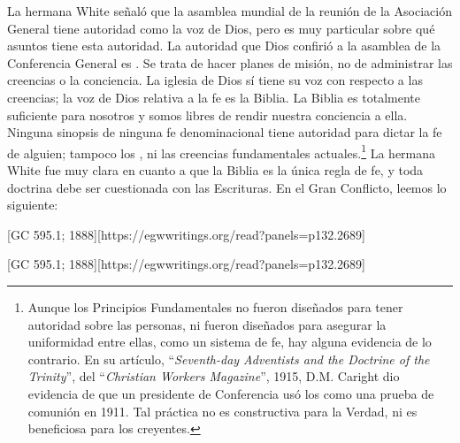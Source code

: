 La hermana White señaló que la asamblea mundial de la reunión de la Asociación General tiene autoridad como la voz de Dios, pero es muy particular sobre qué asuntos tiene esta autoridad. La autoridad que Dios confirió a la asamblea de la Conferencia General es . Se trata de hacer planes de misión, no de administrar las creencias o la conciencia. La iglesia de Dios sí tiene su voz con respecto a las creencias; la voz de Dios relativa a la fe es la Biblia. La Biblia es totalmente suficiente para nosotros y somos libres de rendir nuestra conciencia a ella. Ninguna sinopsis de ninguna fe denominacional tiene autoridad para dictar la fe de alguien; tampoco los , ni las creencias fundamentales actuales.\footnote{Aunque los Principios Fundamentales no fueron diseñados para tener autoridad sobre las personas, ni fueron diseñados para asegurar la uniformidad entre ellas, como un sistema de fe, hay alguna evidencia de lo contrario. En su artículo, “\textit{Seventh-day Adventists and the Doctrine of the Trinity}”, del “\textit{Christian Workers Magazine}”, 1915, D.M. Caright dio evidencia de que un presidente de Conferencia usó los  como una prueba de comunión en 1911. Tal práctica no es constructiva para la Verdad, ni es beneficiosa para los creyentes.} La hermana White fue muy clara en cuanto a que la Biblia es la única regla de fe, y toda doctrina debe ser cuestionada con las Escrituras. En el Gran Conflicto, leemos lo siguiente:


[GC 595.1; 1888][https://egwwritings.org/read?panels=p132.2689]


[GC 595.1; 1888][https://egwwritings.org/read?panels=p132.2689]


